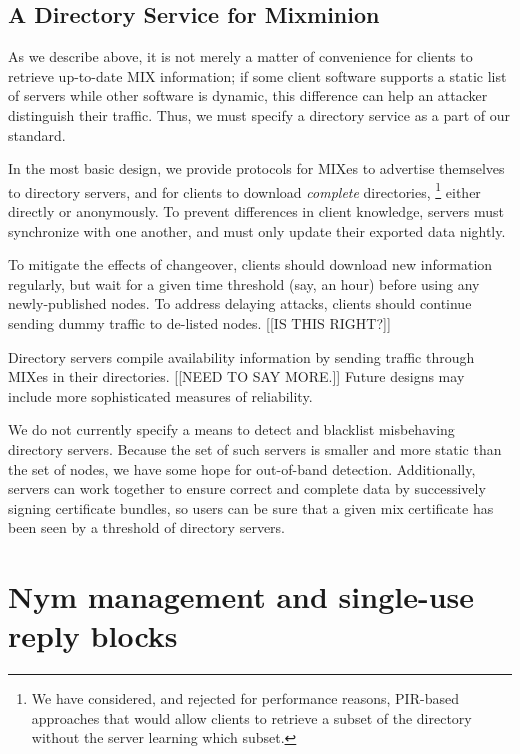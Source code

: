 \documentclass{llncs}
\begin{document}
{\subsection{A Directory Service for Mixminion}
\label{subsec:dir-server-design}

As we describe above, it is not merely a matter of convenience for
clients to retrieve up-to-date MIX information; if some client
software supports a static list of servers while other software is
dynamic, this difference can help an attacker distinguish their
traffic.  Thus, we must specify a directory service as a part of our
standard.

In the most basic design, we provide protocols for MIXes to advertise
themselves to directory servers, and for clients to download
\emph{complete} directories,
  \footnote{We have considered, and rejected for performance reasons, 
            PIR-based \cite{PIR} approaches that would allow clients
            to retrieve a subset of the directory without the
            server learning which subset.} 
either directly or anonymously.  To prevent differences in client
knowledge, servers must synchronize with one another, and must only
update their exported data nightly.

To mitigate the effects of changeover, clients should download new
information regularly, but wait for a given time threshold (say, an
hour) before using any newly-published nodes.  To address delaying
attacks, clients should continue sending dummy traffic to de-listed
nodes. [[IS THIS RIGHT?]]

Directory servers compile availability information by sending traffic
through MIXes in their directories. [[NEED TO SAY MORE.]] Future
designs may include more sophisticated measures of reliability.

We do not currently specify a means to detect and blacklist
misbehaving directory servers.  Because the set of such servers is
smaller and more static than the set of nodes, we have some hope for
out-of-band detection.  Additionally, servers can work together to
ensure correct and complete data by successively signing certificate
bundles, so users can be sure that a given mix certificate has been
seen by a threshold of directory servers.




\section{Nym management and single-use reply blocks}
\label{sec:nymservers}

}
\end{document}
